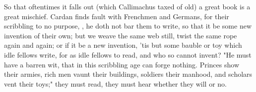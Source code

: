So that oftentimes it falls out (which Callimachus taxed of old) a great book
is a great mischief. Cardan finds fault with Frenchmen and
Germans, for their scribbling to no purpose, , he doth not bar them to write, so that it be
some new invention of their own; but we weave the same web still, twist the
same rope again and again; or if it be a new invention, 'tis but some bauble or
toy which idle fellows write, for as idle fellows to read, and who so cannot
invent? "He must have a barren wit, that in this scribbling
age can forge nothing. Princes show their armies, rich men
vaunt their buildings, soldiers their manhood, and scholars vent their toys;"
they must read, they must hear whether they will or no.


